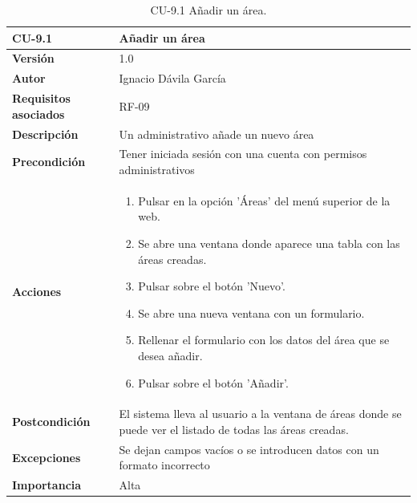 \begin{table}[p]
	\centering
	\begin{tabularx}{\linewidth}{ p{} p{} }
		\toprule
		\textbf{CU-9.1}    & \textbf{Añadir un área}\\
		\toprule
		\textbf{Versión}              & 1.0    \\
		\textbf{Autor}                & Ignacio Dávila García \\
		\textbf{Requisitos asociados} & RF-09 \\
		\textbf{Descripción}          & Un administrativo añade un nuevo área \\
		\textbf{Precondición}         & Tener iniciada sesión con una cuenta con permisos administrativos \\
		\textbf{Acciones}             &
		\begin{enumerate}
			\def\labelenumi{\arabic{enumi}.}
			\tightlist
			\item Pulsar en la opción 'Áreas' del menú superior de la web.
			\item Se abre una ventana donde aparece una tabla con las áreas creadas.
			\item Pulsar sobre el botón 'Nuevo'.
			\item Se abre una nueva ventana con un formulario.
			\item Rellenar el formulario con los datos del área que se desea añadir.
			\item Pulsar sobre el botón 'Añadir'.
		\end{enumerate}\\
		\textbf{Postcondición}        & El sistema lleva al usuario a la ventana de áreas donde se puede ver el listado de todas las áreas creadas. \\
		\textbf{Excepciones}          & Se dejan campos vacíos o se introducen datos con un formato incorrecto \\
		\textbf{Importancia}          & Alta \\
		\bottomrule
	\end{tabularx}
	\caption{CU-9.1 Añadir un área.}
\end{table}

